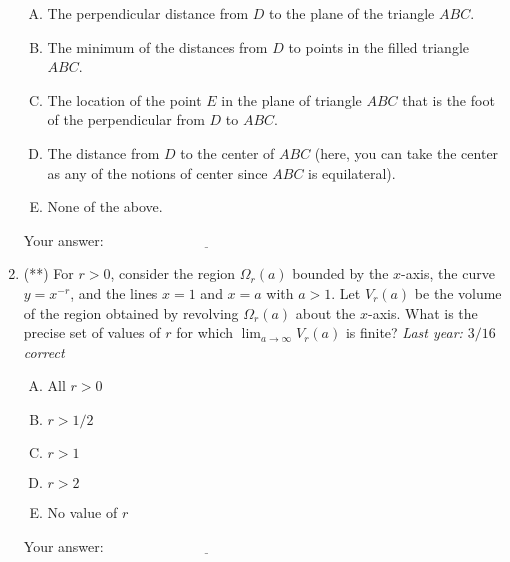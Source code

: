 \documentclass[10pt]{amsart}
\begin{document}
\begin{enumerate}
  \begin{enumerate}[(A)]
  \item The perpendicular distance from $D$ to the plane of the
    triangle $ABC$.
  \item The minimum of the distances from $D$ to points in the filled
    triangle $ABC$.
  \item The location of the point $E$ in the plane of triangle $ABC$
    that is the foot of the perpendicular from $D$ to $ABC$.
  \item The distance from $D$ to the center of $ABC$ (here, you can
    take the center as any of the notions of center since $ABC$ is
    equilateral).
  \item None of the above.
  \end{enumerate}

  
  \vspace{1in}
  Your answer: $\underline{\qquad\qquad\qquad\qquad\qquad\qquad\qquad}$
  \vspace{1in}

\item (**) For $r > 0$, consider the region $\Omega_r(a)$ bounded by
  the $x$-axis, the curve $y = x^{-r}$, and the lines $x = 1$ and $x =
  a$ with $a > 1$. Let $V_r(a)$ be the volume of the region obtained
  by revolving $\Omega_r(a)$ about the $x$-axis. What is the precise
  set of values of $r$ for which $\lim_{a \to \infty} V_r(a)$ is
  finite? {\em Last year: $3/16$ correct}
 
  \begin{enumerate}[(A)]
  \item All $r > 0$
  \item $r > 1/2$
  \item $r > 1$
  \item $r > 2$
  \item No value of $r$
  \end{enumerate}

  \vspace{1in}
Your answer: $\underline{\qquad\qquad\qquad\qquad\qquad\qquad\qquad}$
  

\end{enumerate}
\end{document}
